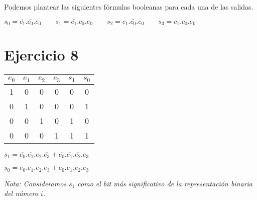 \pagebreak

Podemos plantear las siguientes fórmulas booleanas para cada una de las salidas.

$
s_0 = \overline{c_1}.\overline{c_0}.e_0
\hspace{2em}
s_1 = \overline{c_1}.c_0.e_0
\hspace{2em}
s_2 = c_1.\overline{c_0}.e_0
\hspace{2em}
s_3 = c_1.c_0.e_0
$

\begin{figure}[H]
    
\end{figure}

\section{Ejercicio 8}

\begin{tabular}{|c|c|c|c||c|c|}
    $e_0$ & $e_1$ & $e_2$ & $e_3$ & $s_1$ & $s_0$ \\
    \hline
    1 & 0 & 0 & 0 & 0 & 0 \\
    0 & 1 & 0 & 0 & 0 & 1 \\
    0 & 0 & 1 & 0 & 1 & 0 \\
    0 & 0 & 0 & 1 & 1 & 1 \\
\end{tabular}

$s_1 = \overline{e_0}.\overline{e_1}.e_2.\overline{e_3} + \overline{e_0}.\overline{e_1}.\overline{e_2}.e_3$

$s_0 = \overline{e_0}.e_1.\overline{e_2}.\overline{e_3} + \overline{e_0}.\overline{e_1}.\overline{e_2}.e_3$

\emph{Nota: Consideramos $s_1$ como el bit más significativo de la representación binaria del número $i$.}

\begin{figure}[H]
    
\end{figure}


